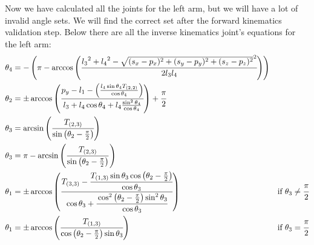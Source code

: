 Now we have calculated all the joints for the left arm, but we will have a lot of invalid angle sets. We will find the correct set after the forward kinematics validation step. Below there are all the inverse kinematics joint's equations for the left arm:
\begin{align*}
\theta_4 &= -\left(\pi - \arccos\left(\cfrac{{l_3}^2 + {l_4}^2 - \sqrt{(s_x-p_x)^2 + (s_y-p_y)^2 + (s_z-p_z)^2}^2 }{2 l_3 l_4}\right)\right)\\
\theta_2 &= \pm\arccos\left(\cfrac{p_y - l_1 - \left(\frac{l_4\sin\theta_4 T_{(2,2)}}{\cos\theta_4}\right)}{l_3 +l_4\cos\theta_4 + l_4\frac{\sin^2\theta_4}{\cos\theta_4}}\right)+\cfrac{\pi}{2}\\
\theta_3 &= \arcsin\left(\cfrac{T_{(2,3)}}{\sin\left(\theta_2-\frac{\pi}{2}\right)}\right)\\
\theta_3 &= \pi - \arcsin\left(\frac{T_{(2,3)}}{\sin\left(\theta_2-\frac{\pi}{2}\right)}\right)\\
\theta_1 &= \pm\arccos\left(\cfrac{T_{(3,3)} - \cfrac{T_{(1,3)}\sin\theta_3\cos\left(\theta_2 - \frac{\pi}{2}\right)}{\cos\theta_3}}{\cos\theta_3 + \cfrac{\cos^2\left(\theta_2-\frac{\pi}{2}\right)\sin^2\theta_3}{\cos\theta_3}}\right) &\text{if } \theta_3 \neq \cfrac{\pi}{2}\\
\theta_1 &= \pm\arccos\left(\cfrac{T_{(1,3)}}{\cos\left(\theta_2 - \frac{\pi}{2}\right)\sin\theta_3}\right) &\text{if } \theta_3 = \cfrac{\pi}{2}
\end{align*}
